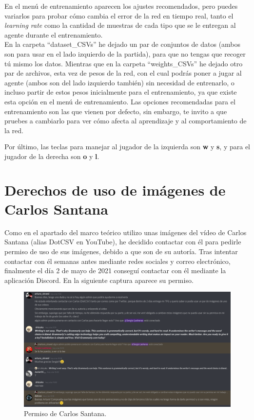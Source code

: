 En el menú de entrenamiento aparecen los ajustes recomendados, pero puedes variarlos para probar cómo cambia el error de la red en tiempo real, tanto el \textit{learning rate} como la cantidad de muestras de cada tipo que se le entregan al agente durante el entrenamiento.
\\
En la carpeta ``dataset\_CSVs'' he dejado un par de conjuntos de datos (ambos son para usar en el lado izquierdo de la partida), para que no tengas que recoger tú mismo los datos. Mientras que en la carpeta ``weights\_CSVs'' he dejado otro par de archivos, esta vez de pesos de la red, con el cual podrás poner a jugar al agente (ambos son del lado izquierdo también) sin necesidad de entrenarlo, o incluso partir de estos pesos inicialmente para el entrenamiento, ya que existe esta opción en el menú de entrenamiento. Las opciones recomendadas para el entrenamiento son las que vienen por defecto, sin embargo, te invito a que pruebes a cambiarlo para ver cómo afecta al aprendizaje y al comportamiento de la red.

Por último, las teclas para manejar al jugador de la izquierda son \textbf{w} y \textbf{s}, y para el jugador de la derecha son \textbf{o} y \textbf{l}.

\section{Derechos de uso de imágenes de Carlos Santana}
Como en el apartado del marco teórico utilizo unas imágenes del vídeo de Carlos Santana (alias DotCSV en YouTube), he decidido contactar con él para pedirle permiso de uso de sus imágenes, debido a que son de su autoría. Tras intentar contactar con él semanas antes mediante redes sociales y correo electrónico, finalmente el día 2 de mayo de 2021 conseguí contactar con él mediante la aplicación Discord. En la siguiente captura aparece su permiso.

\begin{figure}[H]
	\centering
	\includegraphics[width=15cm]{archivos/imagenes/confirmacion-dotcsv-derecho-de-uso.png}
	\caption{Permiso de Carlos Santana.}
\end{figure}